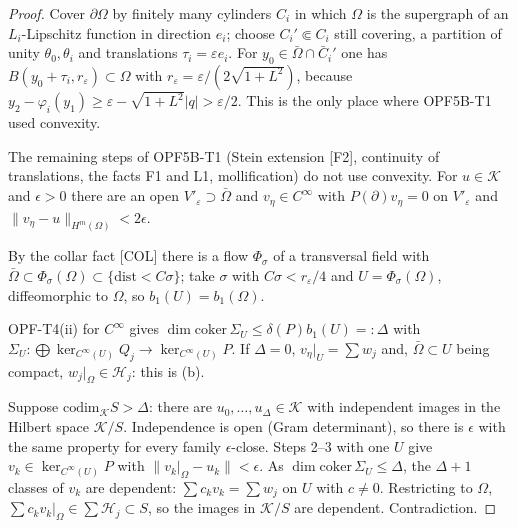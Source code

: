 \begin{proof}
Cover $\partial\Omega$ by finitely many cylinders $C_i$ in which $\Omega$ is the supergraph of an $L_i$-Lipschitz function in direction $e_i$; choose $C_i'\Subset C_i$ still covering, a partition of unity $\theta_0,\theta_i$ and translations $\tau_i=\varepsilon e_i$. For $y_0\in\bar\Omega\cap\bar C_i'$ one has $B(y_0+\tau_i,r_\varepsilon)\subset\Omega$ with $r_\varepsilon=\varepsilon/(2\sqrt{1+L^2})$, because $y_2-\varphi_i(y_1)\ge\varepsilon-\sqrt{1+L^2}|q|>\varepsilon/2$. This is the only place where OPF5B-T1 used convexity.

The remaining steps of OPF5B-T1 (Stein extension [F2], continuity of translations, the facts F1 and L1, mollification) do not use convexity. For $u\in\mathcal K$ and $\epsilon>0$ there are an open $V'_\varepsilon\supset\bar\Omega$ and $v_\eta\in C^\infty$ with $P(\partial)v_\eta=0$ on $V'_\varepsilon$ and $\|v_\eta-u\|_{H^m(\Omega)}<2\epsilon$.

By the collar fact [COL] there is a flow $\Phi_\sigma$ of a transversal field with $\bar\Omega\subset\Phi_\sigma(\Omega)\subset\{\mathrm{dist}<C\sigma\}$; take $\sigma$ with $C\sigma<r_\varepsilon/4$ and $U=\Phi_\sigma(\Omega)$, diffeomorphic to $\Omega$, so $b_1(U)=b_1(\Omega)$.

OPF-T4(ii) for $C^\infty$ gives $\dim\mathrm{coker}\,\Sigma_U\le\delta(P)b_1(U)=:\Delta$ with $\Sigma_U:\bigoplus\ker_{C^\infty(U)}Q_j\to\ker_{C^\infty(U)}P$. If $\Delta=0$, $v_\eta|_U=\sum w_j$ and, $\bar\Omega\subset U$ being compact, $w_j|_\Omega\in\mathcal H_j$: this is (b).

Suppose $\mathrm{codim}_{\mathcal K}S>\Delta$: there are $u_0,\dots,u_\Delta\in\mathcal K$ with independent images in the Hilbert space $\mathcal K/S$. Independence is open (Gram determinant), so there is $\epsilon$ with the same property for every family $\epsilon$-close. Steps 2--3 with one $U$ give $v_k\in\ker_{C^\infty(U)}P$ with $\|v_k|_\Omega-u_k\|<\epsilon$. As $\dim\mathrm{coker}\,\Sigma_U\le\Delta$, the $\Delta+1$ classes of $v_k$ are dependent: $\sum c_kv_k=\sum w_j$ on $U$ with $c\ne0$. Restricting to $\Omega$, $\sum c_kv_k|_\Omega\in\sum\mathcal H_j\subset S$, so the images in $\mathcal K/S$ are dependent. Contradiction.

\end{proof}

